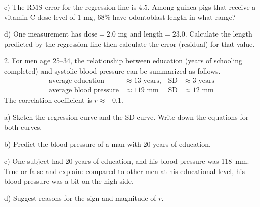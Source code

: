 \documentclass[10pt]{article}
\begin{document}
\hspace{20pt} c) The RMS error for the regression line is $4.5$.
Among guinea pigs that receive a vitamin C dose level of 1 mg, 68\% 
  have odontoblast length in what range?
\vspace{1.2in}

\hspace{20pt} d) One measurement has $\mbox{dose}=2.0$ mg and 
$\mbox{length}=23.0$. Calculate the length predicted by the regression
line then calculate the error (residual) for that value.
\vfill
\eject

2. For men age 25--34, the relationship between education (years of schooling
completed) and systolic blood pressure can be summarized as follows.
\begin{align*}
\mbox{average education} &\approx 13 \mbox{ years},
  & \mbox{SD} &\approx 3 \mbox{ years}\\
\mbox{average blood pressure} &\approx 119 \mbox{ mm}
  & \mbox{SD} &\approx 12 \mbox{ mm}
\end{align*}
The correlation coefficient is $r\approx -0.1$.

\hspace{20pt} a) Sketch the regression curve and the SD curve.
Write down the equations for both curves.
\vspace{2.5in}

\hspace{20pt} b) Predict the blood pressure of a man with 20 years of education.
\vspace{1.5in}

\hspace{20pt} c) One subject  had 20 years of education, and his 
blood pressure was 118~mm.  True or false and explain:  compared to other men
at his educational level, his blood pressure was a bit on the high side.
\vspace{1.4in}

\hspace{20pt} d) Suggest reasons for the sign and magnitude of $r$.
\vfill
\eject          
\end{document}
